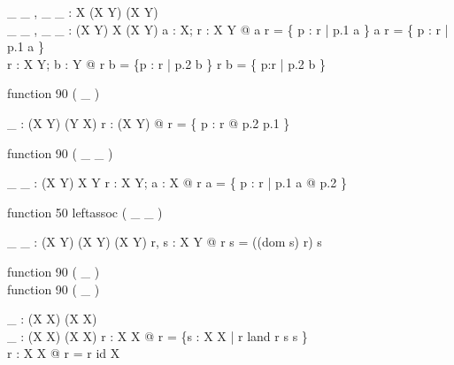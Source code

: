 \begin{gendef}[X, Y]
  \_ \dres \_ , \_ \ndres \_ : \power X \cross (X \rel Y) \fun (X \rel Y)\\
  \_ \rres \_ , \_ \nrres \_ : (X \rel Y) \cross \power X \fun (X \rel Y)
\where
  \forall a : \power X; r : X \rel Y @ a \dres r = 
      \{ p : r | p.1 \in a \} \land a \ndres r = \{ p : r | p.1 \notin a \}\\
  \forall r : X \rel Y; b : \power Y @ r \rres b = \{p : r | p.2 \in b \} \land
      r \nrres b = \{ p:r | p.2 \notin b \}
\end{gendef}

\begin{zed}
  function 90 ( \_ \inv )
\end{zed}

\begin{gendef}[X, Y]
  \_ \inv : (X \rel Y) \fun (Y \rel X)
\where
  \forall r : (X \rel Y) @ r \inv = \{ p : r @ p.2 \mapsto p.1 \}
\end{gendef}

\begin{zed}
  function 90 ( \_ \limg \_ \rimg )
\end{zed}

\begin{gendef}[X, Y]
  \_ \limg \_ \rimg : (X \rel Y) \cross \power X \fun \power Y
\where
  \forall r : X \rel Y; a : \power X @ r \limg a \rimg = 
      \{ p : r | p.1 \in a @ p.2 \}
\end{gendef}

\begin{zed}
  function 50 leftassoc ( \_ \oplus \_ )
\end{zed}

\begin{gendef}[X, Y]
  \_ \oplus \_ : (X \rel Y) \cross (X \rel Y) \fun (X \rel Y)
\where
  \forall r, s : X \rel Y @ r \oplus s = ((dom s) \ndres r) \cup s
\end{gendef}

\begin{zed}
  function 90 ( \_ \plus )\\
  function 90 ( \_ \star )
\end{zed}

\begin{gendef}[X]
  \_ \plus : (X \rel X) \fun (X \rel X)\\
  \_ \star : (X \rel X) \fun (X \rel X)
\where
  \forall r : X \rel X @ r \plus = \bigcap \{s : X \rel X | r
  \subseteq land r \comp s \subseteq s \}\\
  \forall r : X \rel X @ r \star = r \plus \cup id X
\end{gendef}
